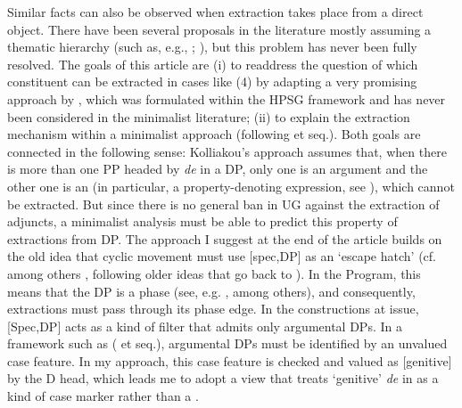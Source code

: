 \documentclass[output=paper]{langsci/langscibook}
\begin{document}
\ea%
    \label{ex:mensch:4}
    \z
\z

Similar facts can also be observed when extraction takes place from a direct object. There have been several proposals in the literature mostly assuming a thematic hierarchy (such as, e.g., \citealt{Pollock1989}; \citealt{Godard1992}), but this problem has never been fully resolved. The goals of this article are (i) to readdress the question of which constituent can be extracted in cases like (4) by adapting a very promising approach by \citet{Kolliakou1999}, which was formulated within the HPSG framework and has never been considered in the minimalist literature; (ii) to explain the extraction mechanism within a minimalist  approach (following \citealt{Chomsky2000} et seq.). Both goals are connected in the following sense: Kolliakou’s approach assumes that, when there is more than one PP headed by \textit{de} in a DP, only one is an argument and the other one is an  (in particular, a property-denoting expression, see \citealt{Chierchia1982,Chierchia1985}), which cannot be extracted. But since there is no general ban in UG against the extraction of adjuncts, a minimalist analysis must be able to predict this property of extractions from DP. The approach I suggest at the end of the article builds on the old idea that cyclic movement must use [spec,DP] as an ‘escape hatch’ (cf. among others \citealt{Gavruseva2000}, following older ideas that go back to \citealt{Cinque1980}). In the  Program, this means that the DP is a phase (see, e.g. \citealt{Heck2008,Heck2009}, among others), and consequently, extractions must pass through its phase edge. In the constructions at issue, [Spec,DP] acts as a kind of filter that admits only argumental DPs. In a framework such as \citeauthor{Chomsky2000} (\citeyear{Chomsky2000} et seq.), argumental DPs must be identified by an unvalued case feature. In my approach, this case feature is checked and valued as [genitive] by the D head, which leads me to adopt a view that treats ‘genitive’ \textit{de} in  as a kind of case marker rather than a .
\end{document}
